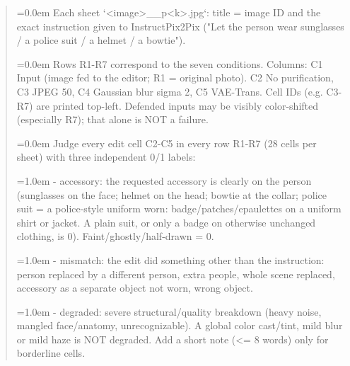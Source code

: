 \begin{quote}\scriptsize\ttfamily\raggedright
\hangindent=0.0em Each sheet `<image>\_\_p<k>.jpg`: title = image ID and the exact instruction given to InstructPix2Pix ("Let the person wear sunglasses / a police suit / a helmet / a bowtie").\par
\smallskip
\hangindent=0.0em Rows R1-R7 correspond to the seven conditions. Columns: C1 Input (image fed to the editor; R1 = original photo). C2 No purification, C3 JPEG 50, C4 Gaussian blur sigma 2, C5 VAE-Trans. Cell IDs (e.g. C3-R7) are printed top-left. Defended inputs may be visibly color-shifted (especially R7); that alone is NOT a failure.\par
\smallskip
\hangindent=0.0em Judge every edit cell C2-C5 in every row R1-R7 (28 cells per sheet) with three independent 0/1 labels:\par
\hangindent=1.0em - accessory: the requested accessory is clearly on the person (sunglasses on the face; helmet on the head; bowtie at the collar; police suit = a police-style uniform worn: badge/patches/epaulettes on a uniform shirt or jacket. A plain suit, or only a badge on otherwise unchanged clothing, is 0). Faint/ghostly/half-drawn = 0.\par
\hangindent=1.0em - mismatch: the edit did something other than the instruction: person replaced by a different person, extra people, whole scene replaced, accessory as a separate object not worn, wrong object.\par
\hangindent=1.0em - degraded: severe structural/quality breakdown (heavy noise, mangled face/anatomy, unrecognizable). A global color cast/tint, mild blur or mild haze is NOT degraded. Add a short note (<= 8 words) only for borderline cells.\par
\end{quote}
